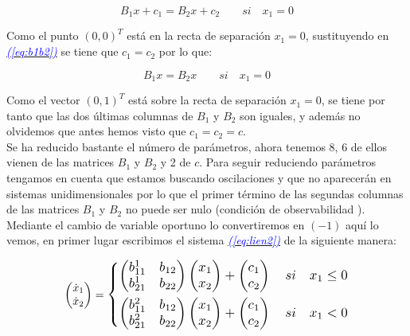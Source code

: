 \documentclass[12pt,a4paper]{report} %
\newcommand{\eref}[1]{\hyperref[#1]{\textcolor{blue}{\textit{(\ref*{#1})}}}}
\begin{document}
	\begin{equation}
		\label{eq:b1b2}
		B_1x+c_1=B_2x+c_2 \qquad si \quad x_1=0
	\end{equation}\smallskip
	
	Como el punto $(0,0)^T$ está en la recta de separación $x_1=0$, sustituyendo en \eref{eq:b1b2} se tiene que $c_1=c_2$ por lo que:
	
	\begin{equation}
		B_1x=B_2x \qquad si \quad x_1=0
	\end{equation}\smallskip
	
	Como el vector $(0,1)^T$ está sobre la recta de separación $x_1=0$, se tiene por tanto que las dos últimas columnas de $B_1$ y $B_2$ son iguales, y además no olvidemos que  antes hemos visto que $c_1=c_2=c$.
	\\ [0.5cm]
	Se ha reducido bastante el número de parámetros, ahora tenemos 8, 6 de ellos vienen de las matrices $B_1$ y $B_2$ y 2 de $c$. Para seguir reduciendo parámetros tengamos en cuenta que estamos buscando oscilaciones y que no aparecerán en sistemas unidimensionales por lo que el primer término de las segundas columnas de las matrices $B_1$ y $B_2$ no puede ser nulo (condición de observabilidad \cite{onsimplyfing}). Mediante el cambio de variable oportuno lo convertiremos en $(-1)$ aquí lo vemos, en primer lugar escribimos el sistema \eref{eq:lien2} de la siguiente manera:
	
	\begin{equation}
		\begin{pmatrix*}[r]
			\dot{x}_1 \\ \dot{x}_2
		\end{pmatrix*}=
		\label{eq:lie-1}
		\scalebox{1.2}{$\displaystyle
			\left\{
			\begin{aligned}
				\begin{pmatrix*}[r]
					b_{11}^1 & b_{12} \\
					b_{21}^1 & b_{22}
				\end{pmatrix*}\begin{pmatrix*}[r]
				x_1\\x_2
				\end{pmatrix*}+\begin{pmatrix*}[r]
				c_1 \\ c_2
				\end{pmatrix*} \quad si \quad x_1 \leq 0 \\
				\begin{pmatrix*}[r]
					b_{11}^2 & b_{12} \\
					b_{21}^2 & b_{22}
				\end{pmatrix*}\begin{pmatrix*}[r]
				x_1\\x_2
				\end{pmatrix*}+\begin{pmatrix*}[r]
					c_1 \\ c_2
				\end{pmatrix*} \quad si \quad x_1 < 0
			\end{aligned}
			\right.
			$}
	\end{equation}\smallskip
	
\end{document}

